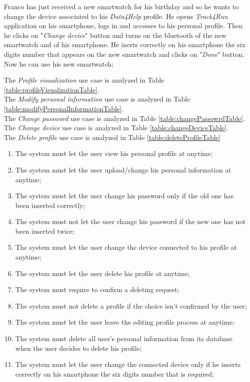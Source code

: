Franco has just received a new smartwatch for his birthday and so he wants to change the device associated to his \textit{Data4Help} profile. He opens \textit{Track4Run} application on his smartphone, logs in and accesses to his personal profile. Then he clicks on "\textit{Change device}" button and turns on the bluetooth of the new smartwatch and of his smartphone. He inerts correctly on his smartphone the six digits number that appears on the new smartwatch and clicks on "\textit{Done}" button. Now he can use his new smartwatch;

The \textit{Profile visualization} use case is analyzed in Table \ref{table:profileVisualizationTable}. \\
The \textit{Modify personal information} use case is analyzed in Table \ref{table:modifyPersonalInformationTable}. \\
The \textit{Change password} use case is analyzed in Table \ref{table:changePassowrdTable}. \\
The \textit{Change device} use case is analyzed in Table \ref{table:changeDeviceTable}. \\
The \textit{Delete profile} use case is analyzed in Table \ref{table:deleteProfileTable} \\

\begin{enumerate}
  \item The system must let the user view his personal profile at anytime;
  \item The system must let the user upload/change his personal information at anytime;
  \item The system must let the user change his password only if the old one has been inserted correctly;
  \item The system must not let the user change his password if the new one has not been inserted twice;
  \item The system must let the user change the device connected to his profile at anytime;
  \item The system must let the user delete his profile at anytime;
  \item The system must require to confirm a deleting request;
  \item The system must not delete a profile if the choice isn't confirmed by the user;
  \item The system must let the user leave the editing profile process at anytime;
  \item The system must delete all user's personal information from its database when the user decides to delete his profile;
  \item The system must let the user change the connected device only if he inserts correctly on his smartphone the six digits number that is required;
\end{enumerate}

